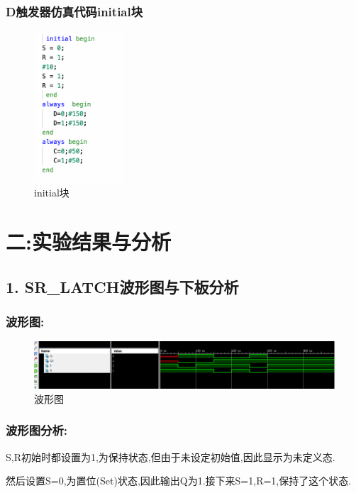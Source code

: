 \documentclass{article}
\begin{document}
\subsubsection*{D触发器仿真代码initial块}
    \begin{figure}[H]
    \centering
    \includegraphics[width=0.3\textwidth]{lab9p/14.png}
    \caption{\label{Lab9}initial块}
    \end{figure}


\section*{二:实验结果与分析}

\subsection*{1. SR\_LATCH波形图与下板分析}
\subsubsection*{波形图:}    
    \begin{figure}[H]
    \centering
    \includegraphics[width=1\textwidth]{lab9p/1.png}
    \caption{\label{Lab9}波形图}
    \end{figure}

\subsubsection*{波形图分析:}
S,R初始时都设置为1,为保持状态,但由于未设定初始值,因此显示为未定义态.

然后设置S=0,为置位(Set)状态,因此输出Q为1.接下来S=1,R=1,保持了这个状态.
\end{document}
